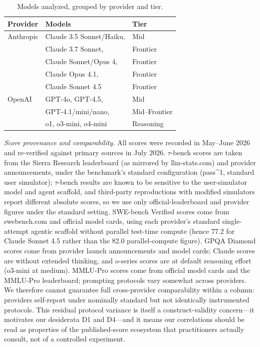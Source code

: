 \documentclass[sigconf]{acmart}
\begin{document}
\begin{table}[h]
\caption{Models analyzed, grouped by provider and tier.}
\label{tab:models}
\begin{tabular}{lll}
\toprule
Provider & Models & Tier \\
\midrule
Anthropic & Claude 3.5 Sonnet/Haiku, & Mid \\
 & Claude 3.7 Sonnet, & Frontier \\
 & Claude Sonnet/Opus 4, & Frontier \\
 & Claude Opus 4.1, & Frontier \\
 & Claude Sonnet 4.5 & Frontier \\
OpenAI & GPT-4o, GPT-4.5, & Mid \\
 & GPT-4.1/mini/nano, & Mid--Frontier \\
 & o1, o3-mini, o4-mini & Reasoning \\
\bottomrule
\end{tabular}
\end{table}

\textit{Score provenance and comparability.} All scores were recorded in May--June 2026 and re-verified against primary sources in July 2026. $\tau$-bench scores are taken from the Sierra Research leaderboard (as mirrored by llm-stats.com) and provider announcements, under the benchmark's standard configuration (pass\textasciicircum{}1, standard user simulator); $\tau$-bench results are known to be sensitive to the user-simulator model and agent scaffold, and third-party reproductions with modified simulators report different absolute scores, so we use only official-leaderboard and provider figures under the standard setting. SWE-bench Verified scores come from swebench.com and official model cards, using each provider's standard single-attempt agentic scaffold without parallel test-time compute (hence 77.2 for Claude Sonnet 4.5 rather than the 82.0 parallel-compute figure). GPQA Diamond scores come from provider launch announcements and model cards; Claude scores are without extended thinking, and o-series scores are at default reasoning effort (o3-mini at medium). MMLU-Pro scores come from official model cards and the MMLU-Pro leaderboard; prompting protocols vary somewhat across providers. We therefore cannot guarantee full cross-provider comparability within a column: providers self-report under nominally standard but not identically instrumented protocols. This residual protocol variance is itself a construct-validity concern---it motivates our desiderata D1 and D4---and it means our correlations should be read as properties of the published-score ecosystem that practitioners actually consult, not of a controlled experiment.
\end{document}
